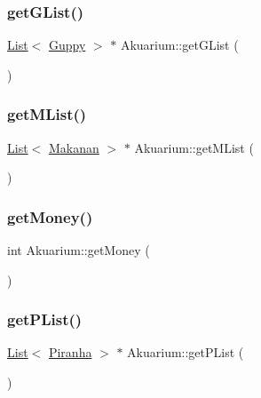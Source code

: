 \mbox{\label{class_akuarium_aea95fa5feed9d17dd8cee6a716413222}} 
\subsubsection{\texorpdfstring{get\+G\+List()}{getGList()}}
{\footnotesize\ttfamily \mbox{\hyperlink{class_list}{List}}$<$ \mbox{\hyperlink{class_guppy}{Guppy}} $>$ $\ast$ Akuarium\+::get\+G\+List (\begin{DoxyParamCaption}{ }\end{DoxyParamCaption})}

\mbox{\label{class_akuarium_aceb32b9271d3de1c5383151d68a16cdb}} 
\subsubsection{\texorpdfstring{get\+M\+List()}{getMList()}}
{\footnotesize\ttfamily \mbox{\hyperlink{class_list}{List}}$<$ \mbox{\hyperlink{class_makanan}{Makanan}} $>$ $\ast$ Akuarium\+::get\+M\+List (\begin{DoxyParamCaption}{ }\end{DoxyParamCaption})}

\mbox{\label{class_akuarium_a641dd24ff82bc9eab91c119cef4ac06c}} 
\subsubsection{\texorpdfstring{get\+Money()}{getMoney()}}
{\footnotesize\ttfamily int Akuarium\+::get\+Money (\begin{DoxyParamCaption}{ }\end{DoxyParamCaption})}

\mbox{\label{class_akuarium_ad6e04ad77928d85f6739b76c9efaaa67}} 
\subsubsection{\texorpdfstring{get\+P\+List()}{getPList()}}
{\footnotesize\ttfamily \mbox{\hyperlink{class_list}{List}}$<$ \mbox{\hyperlink{class_piranha}{Piranha}} $>$ $\ast$ Akuarium\+::get\+P\+List (\begin{DoxyParamCaption}{ }\end{DoxyParamCaption})}

